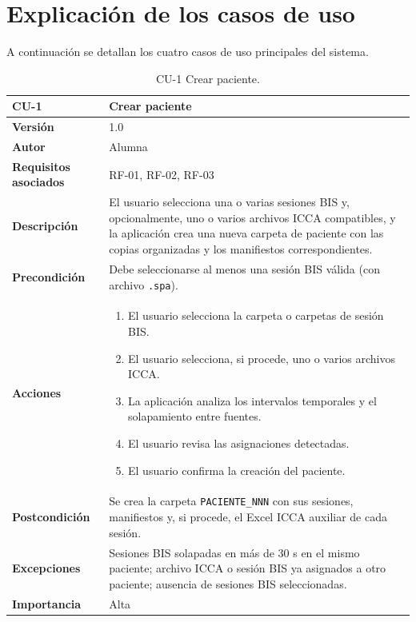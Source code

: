 \documentclass[
  spanish,
  a4paper,
  12pt,
  twoside]{memoir}
\providecommand{\tightlist}{%
  \setlength{\itemsep}{0pt}\setlength{\parskip}{0pt}}
\begin{document}
\chapter{Explicación de los casos de
uso}\label{explicaciuxf3n-de-los-casos-de-uso}

A continuación se detallan los cuatro casos de uso principales del
sistema.

\begin{table}[p]
    \centering
    \begin{tabularx}{\linewidth}{ p{} p{} }
        \toprule
        \textbf{CU-1}    & \textbf{Crear paciente}\\
        \toprule
        \textbf{Versión}              & 1.0    \\
        \textbf{Autor}                & Alumna \\
        \textbf{Requisitos asociados} & RF-01, RF-02, RF-03 \\
        \textbf{Descripción}          & El usuario selecciona una o varias sesiones BIS y, opcionalmente, uno o varios archivos ICCA compatibles, y la aplicación crea una nueva carpeta de paciente con las copias organizadas y los manifiestos correspondientes. \\
        \textbf{Precondición}         & Debe seleccionarse al menos una sesión BIS válida (con archivo \texttt{.spa}). \\
        \textbf{Acciones}             &
        \begin{enumerate}
            \def\labelenumi{\arabic{enumi}.}
            \tightlist
            \item El usuario selecciona la carpeta o carpetas de sesión BIS.
            \item El usuario selecciona, si procede, uno o varios archivos ICCA.
            \item La aplicación analiza los intervalos temporales y el solapamiento entre fuentes.
            \item El usuario revisa las asignaciones detectadas.
            \item El usuario confirma la creación del paciente.
        \end{enumerate}\\
        \textbf{Postcondición}        & Se crea la carpeta \texttt{PACIENTE\_NNN} con sus sesiones, manifiestos y, si procede, el Excel ICCA auxiliar de cada sesión. \\
        \textbf{Excepciones}          & Sesiones BIS solapadas en más de 30 s en el mismo paciente; archivo ICCA o sesión BIS ya asignados a otro paciente; ausencia de sesiones BIS seleccionadas. \\
        \textbf{Importancia}          & Alta \\
        \bottomrule
    \end{tabularx}
    \caption{CU-1 Crear paciente.}
\end{table}
\end{document}
